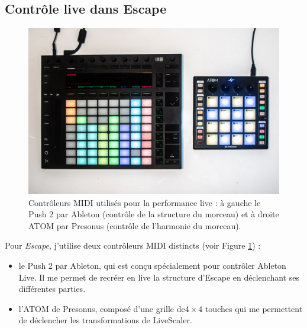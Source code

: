 \subsection{Contrôle live dans Escape}
\begin{figure}[htbp]
  \centering
  \includegraphics[width=\textwidth]{Figures/IMGP9899.jpg}
  \caption{Contrôleurs MIDI utilisés pour la performance live : à gauche le Push 2 par Ableton (contrôle de la structure du morceau) et à droite ATOM par Presonus (contrôle de l'harmonie du morceau).\label{fig:controleurs}}
\end{figure}
Pour \emph{Escape}, j'utilise deux contrôleurs MIDI distincts (voir Figure \ref{fig:controleurs}) :
\begin{itemize}
  \item le Push 2 par Ableton, qui est conçu spécialement pour contrôler Ableton Live. Il me permet de recréer en live la structure d'Escape en déclenchant ses différentes parties.
  \item l'ATOM de Presonus, composé d'une grille de$4\times 4$ touches qui me permettent de déclencher les transformations de LiveScaler.
\end{itemize}






